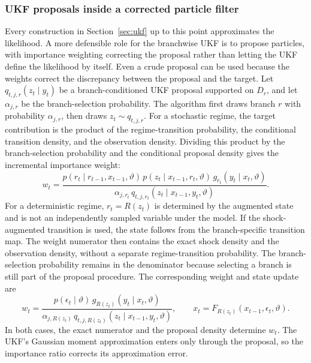 \documentclass[11pt]{article}
\begin{document}
\subsubsection{UKF proposals inside a corrected particle filter}
\label{sec:ukf-proposal}

Every construction in Section~\ref{sec:ukf} up to this point approximates the likelihood. A more defensible role for the branchwise UKF is to propose particles, with importance weighting correcting the proposal rather than letting the UKF define the likelihood by itself. Even a crude proposal can be used because the weights correct the discrepancy between the proposal and the target. Let $q_{t,j,r}(z_t\mid y_t)$ be a branch-conditioned UKF proposal supported on $D_r$, and let $\alpha_{j,r}$ be the branch-selection probability. The algorithm first draws branch $r$ with probability $\alpha_{j,r}$, then draws $z_t\sim q_{t,j,r}$. For a stochastic regime, the target contribution is the product of the regime-transition probability, the conditional transition density, and the observation density. Dividing this product by the branch-selection probability and the conditional proposal density gives the incremental importance weight:
\begin{equation}\label{eq:52}
 w_t=
 \frac{p(r_t\mid r_{t-1},x_{t-1},\vartheta)\,
       p(z_t\mid x_{t-1},r_t,\vartheta)\,
       g_{r_t}(y_t\mid x_t,\vartheta)}
      {\alpha_{j,r_t}\,
       q_{t,j,r_t}(z_t\mid x_{t-1},y_t,\vartheta)}.
\end{equation}
For a deterministic regime, $r_t=R(z_t)$ is determined by the augmented state and is not an independently sampled variable under the model. If the shock-augmented transition is used, the state follows from the branch-specific transition map. The weight numerator then contains the exact shock density and the observation density, without a separate regime-transition probability. The branch-selection probability remains in the denominator because selecting a branch is still part of the proposal procedure. The corresponding weight and state update are
\begin{equation}\label{eq:53}
 w_t=
 \frac{p(\epsilon_t\mid\vartheta)\,
       g_{R(z_t)}(y_t\mid x_t,\vartheta)}
      {\alpha_{j,R(z_t)}\,
       q_{t,j,R(z_t)}(z_t\mid x_{t-1},y_t,\vartheta)},
 \qquad x_t=F_{R(z_t)}(x_{t-1},\epsilon_t,\vartheta).
\end{equation}
In both cases, the exact numerator and the proposal density determine $w_t$. The UKF's Gaussian moment approximation enters only through the proposal, so the importance ratio corrects its approximation error.
\end{document}
